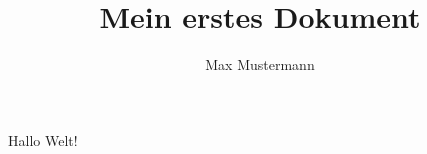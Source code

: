 \documentclass[12pt]{scrartcl}
\author{Max Mustermann}
\title{Mein erstes Dokument}
\begin{document}
\maketitle

Hallo Welt!
\end{document}
